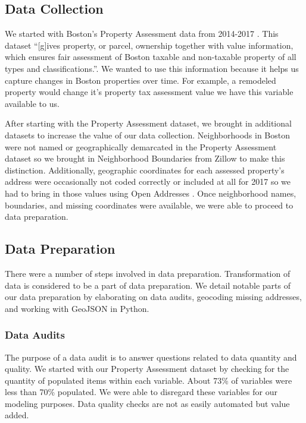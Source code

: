 \documentclass[12pt]{article}
\begin{document}
\subsection{Data Collection}

We started with Boston's Property Assessment data from 2014-2017
\cite{Property49:online}. This dataset ``[g]ives property, or parcel,
ownership together with value information, which ensures fair assessment
of Boston taxable and non-taxable property of all types and
classifications.''\cite{Property49:online}. We wanted to use this
information because it helps us capture changes in Boston properties
over time. For example, a remodeled property would change it's property
tax assessment value we have this variable available to us.

After starting with the Property Assessment dataset, we brought in
additional datasets to increase the value of our data collection.
Neighborhoods in Boston were not named or geographically demarcated in
the Property Assessment dataset so we brought in Neighborhood Boundaries
from Zillow \cite{ZillowNe81:online} to make this distinction.
Additionally, geographic coordinates for each assessed property's address
were occasionally not coded correctly or included at all for 2017 so we 
had to bring in those values using Open Addresses
\cite{OpenAddr24:online}. Once neighborhood names, boundaries, and missing
coordinates were available, we were able to proceed to data preparation.

\subsection{Data Preparation}

There were a number of steps involved in data preparation. Transformation
of data is considered to be a part of data preparation. We detail notable
parts of our data preparation by elaborating on data audits, geocoding
missing addresses, and working with GeoJSON in Python.

\subsubsection{Data Audits}

The purpose of a data audit is to answer questions related to data
quantity and quality. We started with our Property Assessment dataset
by checking for the quantity of populated items within each variable.
About 73\% of variables were less than 70\% populated. We were able to
disregard these variables for our modeling purposes. Data quality checks
are not as easily automated but value added.
\end{document}
